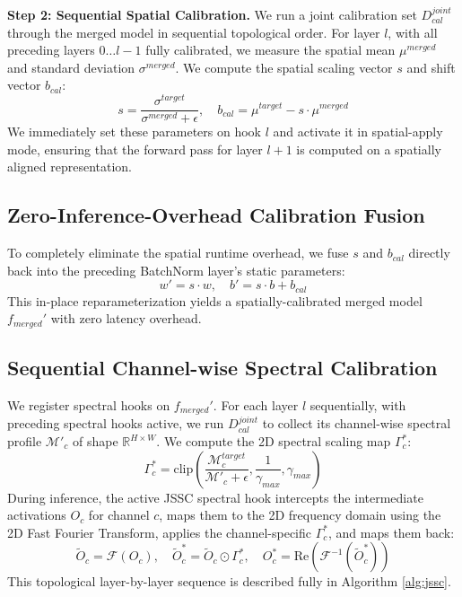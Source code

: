 \documentclass{article}
\begin{document}
\textbf{Step 2: Sequential Spatial Calibration.} We run a joint calibration set $D_{cal}^{joint}$ through the merged model in sequential topological order. For layer $l$, with all preceding layers $0 \dots l-1$ fully calibrated, we measure the spatial mean $\mu^{merged}$ and standard deviation $\sigma^{merged}$. We compute the spatial scaling vector $s$ and shift vector $b_{cal}$:
\begin{equation}
    s = \frac{\sigma^{target}}{\sigma^{merged} + \epsilon}, \quad b_{cal} = \mu^{target} - s \cdot \mu^{merged}
\end{equation}
We immediately set these parameters on hook $l$ and activate it in spatial-apply mode, ensuring that the forward pass for layer $l+1$ is computed on a spatially aligned representation.

\subsection{Zero-Inference-Overhead Calibration Fusion}
To completely eliminate the spatial runtime overhead, we fuse $s$ and $b_{cal}$ directly back into the preceding BatchNorm layer's static parameters:
\begin{equation}
    w' = s \cdot w, \quad b' = s \cdot b + b_{cal}
\end{equation}
This in-place reparameterization yields a spatially-calibrated merged model $f_{merged}'$ with zero latency overhead.

\subsection{Sequential Channel-wise Spectral Calibration}
We register spectral hooks on $f_{merged}'$. For each layer $l$ sequentially, with preceding spectral hooks active, we run $D_{cal}^{joint}$ to collect its channel-wise spectral profile $\mathcal{M}'_c$ of shape $\mathbb{R}^{H \times W}$. We compute the 2D spectral scaling map $\Gamma_c^*$:
\begin{equation}
    \Gamma_c^* = \text{clip}\left( \frac{\mathcal{M}^{target}_c}{\mathcal{M}'_c + \epsilon}, \frac{1}{\gamma_{max}}, \gamma_{max} \right)
\end{equation}
During inference, the active JSSC spectral hook intercepts the intermediate activations $O_c$ for channel $c$, maps them to the 2D frequency domain using the 2D Fast Fourier Transform, applies the channel-specific $\Gamma_c^*$, and maps them back:
\begin{equation}
    \tilde{O}_c = \mathcal{F}(O_c), \quad \tilde{O}^*_c = \tilde{O}_c \odot \Gamma_c^*, \quad O^*_c = \text{Re}(\mathcal{F}^{-1}(\tilde{O}^*_c))
\end{equation}
This topological layer-by-layer sequence is described fully in Algorithm \ref{alg:jssc}.
\end{document}
